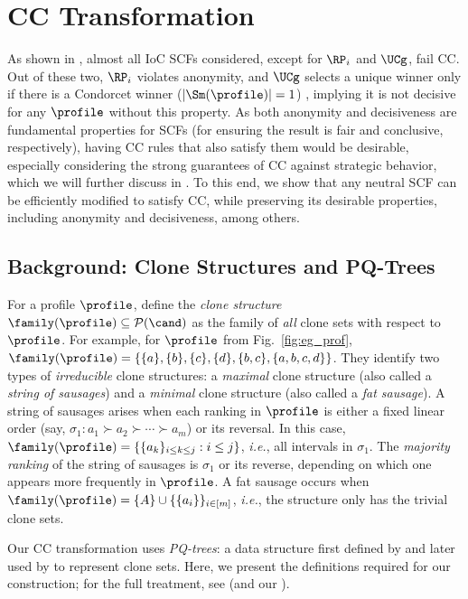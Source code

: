 \section{CC Transformation}
\label{sec:cc_transform}

As shown in , almost all IoC SCFs considered, except for $\RP_i$ and $\UCg$, fail CC. Out of these two, $\RP_i$ violates anonymity, and $\UCg$ selects a unique winner only if there is a Condorcet winner ($|\Sm(\profile)|=1$) \citep{Holliday23:Split}, implying it is not decisive for any $\profile$ without this property. As both anonymity and decisiveness are fundamental properties for SCFs (for ensuring the result is fair and conclusive, respectively), having CC rules that also satisfy them would be desirable, especially considering the strong guarantees of CC against strategic behavior, which we will further discuss in . To this end, we show that any neutral SCF can be efficiently modified to satisfy CC, while preserving its desirable properties, including anonymity and decisiveness, among others.

\subsection{Background: Clone Structures and PQ-Trees}\label{subsec:pqtrees}
For a profile $\profile$, \citet{Elkind10:Clone} define the \emph{clone structure} $\family(\profile) \subseteq \mathcal{P}(\cand)$ as the family of \textit{all} clone sets with respect to $\profile$. For example, for $\profile$ from Fig.~\ref{fig:eg_prof}, $\family(\profile)=\{\{a\},\{b\}, \{c\}, \{d\}, \{b,c\}, \{a,b,c,d\}\}$. They identify two types of \emph{irreducible} clone structures: a \emph{maximal} clone structure (also called a \emph{string of sausages}) and a \emph{minimal} clone structure (also called a \emph{fat sausage}). A string of sausages arises when each ranking in  $\profile$ is either a fixed linear order (say, $\sigma_1 : a_1 \succ a_2 \succ \cdots \succ a_m$) or its reversal. In this case, $\family(\profile) = \{ \{a_k\}_{i\le k\le j}: i\le j\}$, \emph{i.e.}, all intervals in $\sigma_1$. The \emph{majority ranking} of the string of sausages is $\sigma_1$ or its reverse, depending on which one appears more frequently in $\profile$. A fat sausage occurs when $\family(\profile) = \{A\} \cup \{\{a_i\}\}_{i \in [m]}$, \emph{i.e.}, the structure only has the trivial clone sets. 

Our CC transformation uses \emph{PQ-trees}: a data structure first defined by \citet{Booth76:Testing} and later used by \citet{Elkind10:Clone} to represent clone sets.
Here, we present the definitions required for our construction; for the full treatment, see \citet{Elkind10:Clone}
(and our ).

